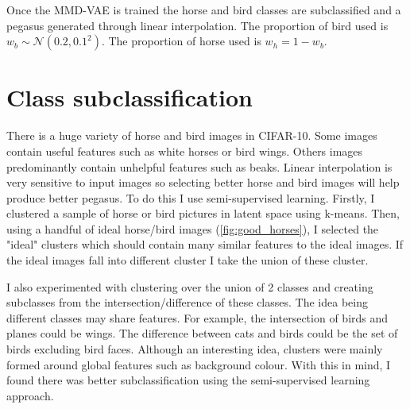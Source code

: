 \documentclass{article}
\begin{document}
Once the MMD-VAE is trained the horse and bird classes are subclassified and a pegasus generated through linear interpolation. The proportion of bird used is $w_b \sim \mathcal{N}(0.2, 0.1^2)$. The proportion of horse used is $w_h = 1-w_b$.

\section{Class subclassification}
There is a huge variety of horse and bird images in CIFAR-10. Some images contain useful features such as white horses or bird wings. Others images predominantly contain unhelpful features such as beaks. Linear interpolation is very sensitive to input images so selecting better horse and bird images will help produce better pegasus. To do this I use semi-supervised learning. Firstly, I clustered a sample of horse or bird pictures in latent space using k-means. Then, using a handful of ideal horse/bird images (\ref{fig:good_horses}), I selected the "ideal" clusters which should contain many similar features to the ideal images. If the ideal images fall into different cluster I take the union of these cluster.

I also experimented with clustering over the union of 2 classes and creating subclasses from the intersection/difference of these classes. The idea being different classes may share features. For example, the intersection of birds and planes could be wings. The difference between cats and birds could be the set of birds excluding bird faces. Although an interesting idea, clusters were mainly formed around global features such as background colour. With this in mind, I found there was better subclassification using the semi-supervised learning approach.
\end{document}
